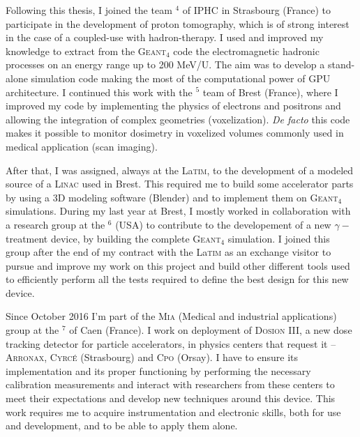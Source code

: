 \documentclass[11pt,a4paper,sans]{moderncv}        %
\begin{document}
Following this thesis, I joined the team \href{http://www.iphc.cnrs.fr/-ImaBio-.html}{\underline{\color{blue}{ImaBio}}}$^4$ of IPHC in Strasbourg (France) to participate in the development of proton tomography, which is of strong interest in the case of a coupled-use with hadron-therapy.
I used and improved my knowledge to extract from the G\textsc{eant}$_4$ code the electromagnetic hadronic processes on an energy range up to 200 MeV/U.
The aim was to develop a stand-alone simulation code making the most of the computational power of GPU architecture.
I continued this work with the \href{http://latim.univ-brest.fr/}{\underline{}}$^5$ team of Brest (France), where I improved my code by implementing the physics of electrons and positrons and allowing the integration of complex geometries (voxelization).
\textit{De facto} this code makes it possible to monitor dosimetry in voxelized volumes commonly used in medical application (scan imaging).

After that, I was assigned, always at the La\textsc{tim}, to the development of a modeled source of a L\textsc{inac} used in Brest.
This required me to build some accelerator parts by using a 3D modeling software (Blender) and to implement them on G\textsc{eant}$_4$ simulations. 
During my last year at Brest, I mostly worked in collaboration with a research group at the \href{http://www.clemson.edu/ces/takacs/medical.html}{\underline{\color{blue}{Clemson University}}}$^6$ (USA) to contribute to the developement of a new $\gamma-$treatment device, by building the complete G\textsc{eant}$_4$ simulation. 
I joined this group after the end of my contract with the La\textsc{tim} as an exchange visitor to pursue and improve my work on this project and build other different tools used to efficiently perform all the tests required to define the best design for this new device.

Since October 2016 I'm part of the M\textsc{ia} (Medical and industrial applications) group at the \href{http://www.lpc-caen.in2p3.fr/article371.html}{\underline{}}$^7$ of Caen (France).
I work on deployment of D\textsc{osion} III, a new dose tracking detector for particle accelerators, in physics centers that request it -- A\textsc{rronax}, C\textsc{yrcé} (Strasbourg) and C\textsc{po} (Orsay).
I have to ensure its implementation and its proper functioning by performing the necessary calibration measurements and interact with researchers from these centers to meet their expectations and develop new techniques around this device.
This work requires me to acquire instrumentation and electronic skills, both for use and development, and to be able to apply them alone.
\end{document}
